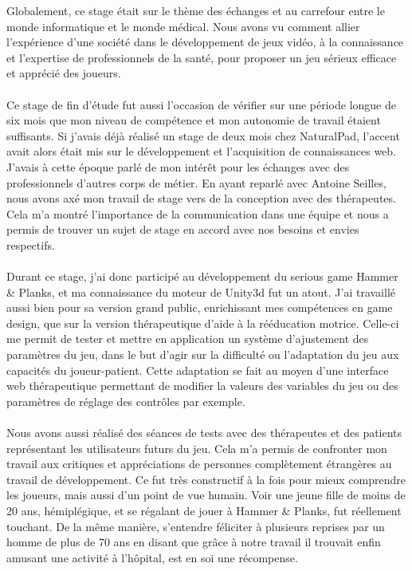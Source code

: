 Globalement, ce stage était sur le thème des échanges et au carrefour entre le monde informatique et le monde médical. Nous avons vu comment allier l'expérience d'une société dans le développement de jeux vidéo, à la connaissance et l'expertise de professionnels de la santé, pour proposer un jeu sérieux efficace et apprécié des joueurs.

\paragraph{}
Ce stage de fin d'étude fut aussi l'occasion de vérifier sur une période longue de six mois que mon niveau de compétence et mon autonomie de travail étaient suffisants. Si j'avais déjà réalisé un stage de deux mois chez NaturalPad, l'accent avait alors était mis sur le développement et l'acquisition de connaissances web. J'avais à cette époque parlé de mon intérêt pour les échanges avec des professionnels d'autres corps de métier. En ayant reparlé avec Antoine Seilles, nous avons axé mon travail de stage vers de la conception avec des thérapeutes. Cela m'a montré l'importance de la communication dans une équipe et nous a permis de trouver un sujet de stage en accord avec nos besoins et envies respectifs.

\paragraph{}
Durant ce stage, j'ai donc participé au développement du serious game Hammer \& Planks, et ma connaissance du moteur de Unity3d fut un atout. J'ai travaillé aussi bien pour sa version grand public, enrichissant mes compétences en game design, que sur la version thérapeutique d'aide à la rééducation motrice. Celle-ci me permit de tester et mettre en application un système d'ajustement des paramètres du jeu, dans le but d'agir sur la difficulté ou l'adaptation du jeu aux capacités du joueur-patient. Cette adaptation se fait au moyen d'une interface web thérapeutique permettant de modifier la valeurs des variables du jeu ou des paramètres de réglage des contrôles par exemple.

\paragraph{}
Nous avons aussi réalisé des séances de tests avec des thérapeutes et des patients représentant les utilisateurs futurs du jeu. Cela m'a permis de confronter mon travail aux critiques et appréciations de personnes complètement étrangères au travail de développement. Ce fut très constructif à la fois pour mieux comprendre les joueurs, mais aussi d'un point de vue humain. Voir une jeune fille de moins de 20 ans, hémiplégique, et se régalant de jouer à Hammer \& Planks, fut réellement touchant. De la même manière, s'entendre féliciter à plusieurs reprises par un homme de plus de 70 ans en disant que grâce à notre travail il trouvait enfin amusant une activité à l'hôpital, est en soi une récompense.

